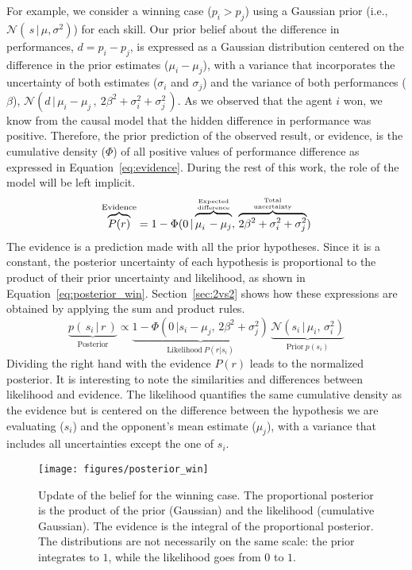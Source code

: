 \documentclass[article]{jss}
\newcommand{\N}{\mathcal{N}}
\newcommand\hfrac[2]{\genfrac{}{}{0pt}{}{#1}{#2}} %
\begin{document}

For example, we consider a winning case ($p_i > p_j$) using a Gaussian prior (i.e.,~$\N(\,s\,|\,\mu, \sigma^2)$) for each skill.
Our prior belief about the difference in performances, $d=p_i-p_j$, is expressed as a Gaussian distribution centered on the difference in the prior estimates ($\mu_i -\mu_j$), with a variance that incorporates the uncertainty of both estimates ($\sigma_i$ and $\sigma_j$) and the variance of both performances ($\beta$), $\N( d \, | \, \mu_i -\mu_j \, ,\ 2\beta^2 + \sigma_i^2 + \sigma_j^2 \,)$. 
As we observed that the agent $i$ won, we know from the causal model that the hidden difference in performance was positive. 
Therefore, the prior prediction of the observed result, or evidence, is the cumulative density ($\Phi$) of all positive values of performance difference as expressed in Equation~\ref{eq:evidence}. 
During the rest of this work, the role of the model will be left implicit. 
%
\begin{equation}\label{eq:evidence}
 \overbrace{P(r)}^{\text{Evidence}} = 1-\Phi(0 \, | \overbrace{\mu_i^{\phantom{2}} - \mu_j}^{\hfrac{\text{Expected}}{\text{difference}}} , \, \overbrace{2\beta^2 + \sigma_i^2+ \sigma_j^2}^{\hfrac{\text{Total}}{\text{uncertainty}}})
\end{equation}
%
The evidence is a prediction made with all the prior hypotheses. 
Since it is a constant, the posterior uncertainty of each hypothesis is proportional to the product of their prior uncertainty and likelihood, as shown in Equation~\ref{eq:posterior_win}. 
Section~\ref{sec:2vs2} shows how these expressions are obtained by applying the sum and product rules. 
%
\begin{equation}\label{eq:posterior_win}
\underbrace{p(\,s_i\, | \, r \, )}_{\text{Posterior}} \propto \underbrace{1-\Phi(0 \, |  s_i - \mu_j , \, 2\beta^2 + \sigma_j^2)}_{\text{Likelihood} \ P(r|s_i)} \,  \underbrace{\N(s_i \, | \, \mu_i,\, \sigma_i^2)}_{\text{Prior} \ p(s_i)} 
\end{equation}
Dividing the right hand with the evidence $P(r)$ leads to the normalized posterior.
It is interesting to note the similarities and differences between likelihood and evidence. 
The likelihood quantifies the same cumulative density as the evidence but is centered on the difference between the hypothesis we are evaluating ($s_i$) and the opponent's mean estimate ($\mu_j$), with a variance that includes all uncertainties except the one of $s_i$. 
%
\begin{figure}[ht!]
    \centering
    \texttt{[image: figures/posterior\_win]}
    \caption{Update of the belief for the winning case. 
    The proportional posterior is the product of the prior (Gaussian) and the likelihood (cumulative Gaussian). 
    The evidence is the integral of the proportional posterior. 
    The distributions are not necessarily on the same scale: the prior integrates to $1$, while the likelihood goes from $0$ to $1$. 
    }
    \label{fig:posterior_win}
\end{figure}
\end{document}
